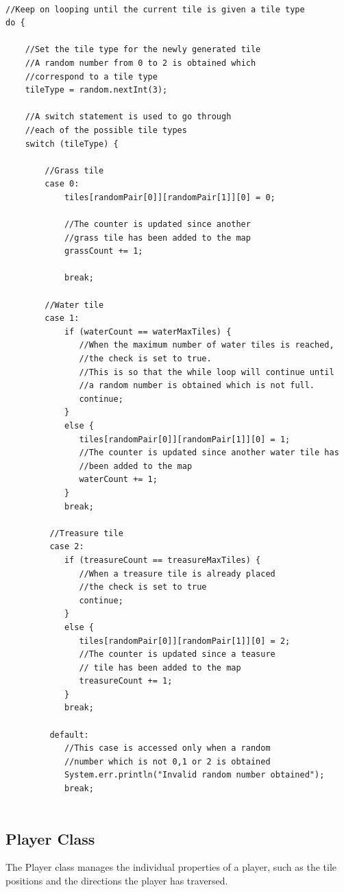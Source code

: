 \documentclass[a4paper,12pt]{extarticle}
\begin{document}
\begin{lstlisting}

//Keep on looping until the current tile is given a tile type
do {

    //Set the tile type for the newly generated tile
    //A random number from 0 to 2 is obtained which 
    //correspond to a tile type
    tileType = random.nextInt(3);

    //A switch statement is used to go through
    //each of the possible tile types
    switch (tileType) {

        //Grass tile
        case 0:
        	tiles[randomPair[0]][randomPair[1]][0] = 0;

        	//The counter is updated since another 
            //grass tile has been added to the map
            grassCount += 1;

            break;

        //Water tile
        case 1:
            if (waterCount == waterMaxTiles) {
               //When the maximum number of water tiles is reached,
               //the check is set to true.
               //This is so that the while loop will continue until 
               //a random number is obtained which is not full.
               continue;
            } 
            else {
               tiles[randomPair[0]][randomPair[1]][0] = 1;
               //The counter is updated since another water tile has
               //been added to the map
               waterCount += 1;
            }
            break;

         //Treasure tile
         case 2:
            if (treasureCount == treasureMaxTiles) {
               //When a treasure tile is already placed 
               //the check is set to true
               continue;
            } 
            else {
               tiles[randomPair[0]][randomPair[1]][0] = 2;
               //The counter is updated since a teasure
               // tile has been added to the map
               treasureCount += 1;
            }
            break;

         default:
            //This case is accessed only when a random 
            //number which is not 0,1 or 2 is obtained
            System.err.println("Invalid random number obtained");
            break;
                
\end{lstlisting}
\vspace{4mm}

\newpage
\subsection{Player Class}
\noindent The Player class manages the individual properties of a player, such as the tile positions and the directions the player has traversed.\\
\end{document}
